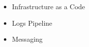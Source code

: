 
\divider

\begin{itemize}
    \item Infrastructure as a Code
\end{itemize}


\divider

\begin{itemize}
    \item Logs Pipeline
\end{itemize}


\divider

\begin{itemize}
    \item Messaging
\end{itemize}



\bigskip
\bigskip
\bigskip
\bigskip
\bigskip
\bigskip


\clearpage
